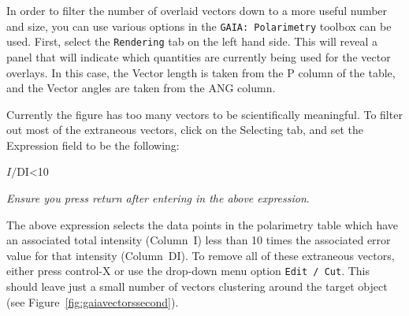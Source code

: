 In order to filter the number of overlaid vectors down to a more
useful number and size, you can use various options in the
\texttt{GAIA: Polarimetry} toolbox can be used. First, select the
\texttt{Rendering} tab on the
left hand side. This will reveal a panel that will indicate which
quantities are currently being used for the vector overlays. In this
case, the Vector length is taken from the P column of the table, and
the Vector angles are taken from the ANG column.

Currently the figure has too many vectors to be scientifically
meaningful. To filter out most of the extraneous vectors, click on the
Selecting tab, and set the Expression field to be the following:

\begin{terminalv}
$I/$DI<10
\end{terminalv}

\emph{Ensure you press return after entering in the above expression}.

The above expression selects the data points in the polarimetry table
which have an associated total intensity (Column~I) less than 10 times
the associated error value for that intensity (Column~DI). To remove
all of these extraneous vectors, either press control-X or use the
drop-down menu option \texttt{Edit / Cut}.  This should leave just a
small number of vectors clustering around the target object (see
Figure~\ref{fig:gaiavectorssecond}).

